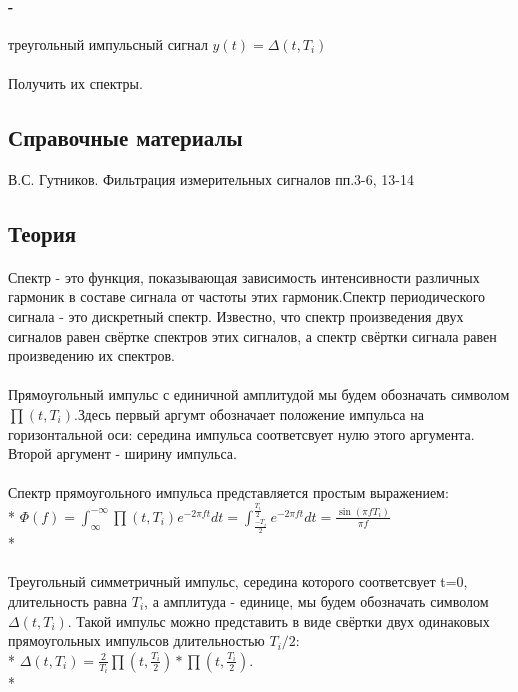 \documentclass[10pt,a4paper]{article}
\begin{document}
\paragraph*{-} треугольный импульсный сигнал $y(t)=\Delta(t,T_i)$
\paragraph*{}Получить их спектры.
\subsection{Справочные материалы}
В.С. Гутников. Фильтрация измерительных сигналов пп.3-6, 13-14
\subsection{Теория}
\paragraph*{}Спектр - это функция, показывающая зависимость интенсивности различных гармоник в составе сигнала от частоты этих гармоник.Спектр периодического сигнала - это дискретный спектр. Известно, что спектр произведения двух сигналов равен свёртке спектров этих сигналов, а спектр свёртки сигнала равен произведению их спектров.
\paragraph*{}Прямоугольный импульс с единичной амплитудой мы будем обозначать символом $\prod(t,T_i)$.Здесь первый аргумт обозначает положение импульса на горизонтальной оси: середина импульса соответсвует нулю этого аргумента. Второй аргумент - ширину импульса. 
\paragraph*{}Спектр прямоугольного импульса представляется простым выражением:\\*
$\Phi(f)=\int_{\infty}^{- \infty}\prod(t,T_i)e^{-2\pi ft}dt=\int_{\frac{- T_i}{2}}^{\frac{T_i}{2}}e^{-2\pi ft}dt=\frac{\sin(\pi f T_i)}{\pi f}$
\\*
\paragraph*{}Треугольный симметричный импульс, середина которого соответсвует t=0, длительность равна $T_i$, а амплитуда - единице, мы будем обозначать символом $\Delta(t, T_i)$. Такой импульс можно представить в виде свёртки двух одинаковых прямоугольных импульсов длительностью $T_i/2$:\\*
$\Delta(t,T_i)=\frac{2}{T_i}\prod(t,\frac{T_i}{2})*\prod(t,\frac{T_i}{2})$.\\*
\end{document}
